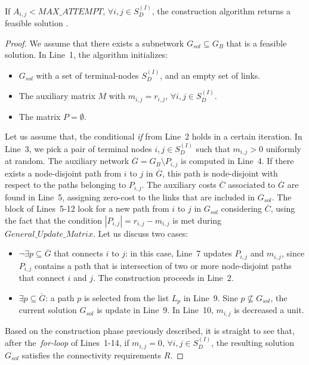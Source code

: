 \begin{proposition}
If $A_{i,j}<MAX\_ATTEMPT, \, \forall i,j\in S_{D}^{(I)}$, the construction algorithm 
returns a feasible solution \cite{11}.
\end{proposition}
\begin{proof}
We assume that there exists a subnetwork $G_{sol} \subseteq G_B$ that is a feasible solution. 
In Line~1, the algorithm initializes:
\begin{itemize}
\item $G_{sol}$ with a set of terminal-nodes $S_{D}^{(I)}$, and an empty set of links.
\item The auxiliary matrix $M$ with $m_{i,j}=r_{i,j}$, $\forall i,j \in S_{D}^{(I)}$.
\item The matrix $P=\emptyset$. 
\end{itemize}

Let us assume that, the conditional \textit{if} from Line~2 holds in a certain iteration. 
In Line~3, we pick a pair of terminal nodes $i,j \in S_{D}^{(I)}$ such that 
$m_{i,j}>0$ uniformly at random. The auxiliary network $\overline{G}=G_B \setminus P_{i,j}$ 
is computed in Line~4. If there exists a node-disjoint path from $i$ to $j$ in $\overline{G}$, 
this path is node-disjoint with respect to the paths belonging to $P_{i,j}$. The 
auxiliary costs $\overline{C}$ associated to $\overline{G}$ are found in Line~5, 
assigning zero-cost to the links that are included in $G_{sol}$. The block of Lines~5-12 look 
for a new path from $i$ to $j$ in $G_{sol}$ considering $\overline{C}$, using the 
fact that the condition $|P_{i,j}|=r_{i,j}-m_{i,j}$ is met during $General\_Update\_Matrix$. 
Let us discuss two cases:
\begin{itemize}
\item $\lnot \exists p \subseteq \overline{G}$ that connects $i$ to $j$: in this case, 
Line~7 updates $P_{i,j}$ and $m_{i,j}$, since $P_{i,j}$ contains a path that is 
intersection of two or more node-disjoint paths that connect $i$ and $j$. 
The construction proceeds in Line~2.  
\item $\exists p \subseteq \overline{G}$: a path $p$ is selected from the list $L_p$ 
in Line~9. Sine $p \nsubseteq G_{sol}$, the current solution $G_{sol}$ is update in 
Line~9. In Line~10, $m_{i,j}$ is decreased a unit. 
\end{itemize} 

Based on the construction phase previously described, it is straight to see that, 
after the~\textit{for-loop} of Lines~1-14, if $m_{i,j}=0, \, \forall i,j \in S_{D}^{(I)}$, 
the resulting solution $G_{sol}$ satisfies the connectivity requirements $R$. 
\end{proof}

